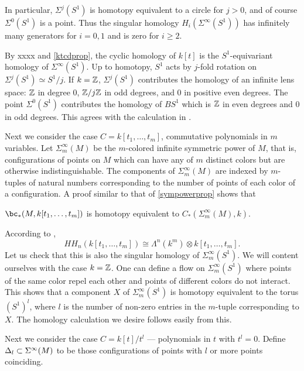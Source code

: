 \documentclass[11pt,leqno]{amsart}
\begin{document}
In particular, $\Sigma^j(S^1)$ is homotopy equivalent to a circle for $j>0$, and
of course $\Sigma^0(S^1)$ is a point.
Thus the singular homology $H_i(\Sigma^\infty(S^1))$ has infinitely many generators for $i=0,1$
and is zero for $i\ge 2$.

By xxxx and \ref{ktcdprop}, 
the cyclic homology of $k[t]$ is the $S^1$-equivariant homology of $\Sigma^\infty(S^1)$.
Up to homotopy, $S^1$ acts by $j$-fold rotation on $\Sigma^j(S^1) \simeq S^1/j$.
If $k = \mathbb{Z}$, $\Sigma^j(S^1)$ contributes the homology of an infinite lens space: $\mathbb{Z}$ in degree
0, $\mathbb{Z}/j \mathbb{Z}$ in odd degrees, and 0 in positive even degrees.
The point $\Sigma^0(S^1)$ contributes the homology of $BS^1$ which is $\mathbb{Z}$ in even 
degrees and 0 in odd degrees.
This agrees with the calculation in .

\medskip

Next we consider the case $C = k[t_1, \ldots, t_m]$, commutative polynomials in $m$ variables.
Let $\Sigma_m^\infty(M)$ be the $m$-colored infinite symmetric power of $M$, that is, configurations
of points on $M$ which can have any of $m$ distinct colors but are otherwise indistinguishable.
The components of $\Sigma_m^\infty(M)$ are indexed by $m$-tuples of natural numbers
corresponding to the number of points of each color of a configuration.
A proof similar to that of \ref{sympowerprop} shows that

\begin{prop}
$\bc_*(M, k[t_1, \ldots, t_m])$ is homotopy equivalent to $C_*(\Sigma_m^\infty(M), k)$.
\end{prop}

According to ,
\[
	HH_n(k[t_1, \ldots, t_m]) \cong \Lambda^n(k^m) \otimes k[t_1, \ldots, t_m] .
\]
Let us check that this is also the singular homology of $\Sigma_m^\infty(S^1)$.
We will content ourselves with the case $k = \mathbb{Z}$.
One can define a flow on $\Sigma_m^\infty(S^1)$ where points of the same color repel each other and points of different colors do not interact.
This shows that a component $X$ of $\Sigma_m^\infty(S^1)$ is homotopy equivalent
to the torus $(S^1)^l$, where $l$ is the number of non-zero entries in the $m$-tuple
corresponding to $X$.
The homology calculation we desire follows easily from this.


\medskip

Next we consider the case $C = k[t]/t^l$ --- polynomials in $t$ with $t^l = 0$.
Define $\Delta_l \subset \Sigma^\infty(M)$ to be those configurations of points with $l$ or
more points coinciding.
\end{document}
